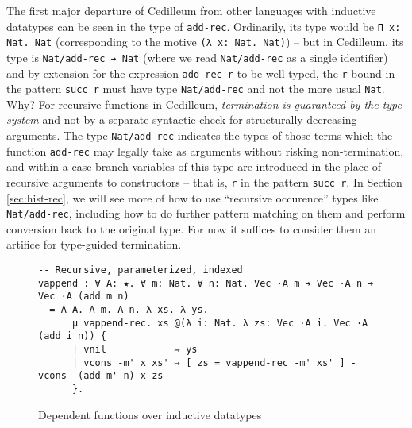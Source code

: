 \documentclass{article}
\newcommand{\vars}[1]{{\overline{#1}}}
\begin{document}
The first major departure of Cedilleum from other languages with inductive
datatypes can be seen in the type of \texttt{add-rec}. Ordinarily, its type
would be \verb;Π x: Nat. Nat; (corresponding to the motive
\verb;(λ x: Nat. Nat);) -- but in Cedilleum, its type is
\verb;Nat/add-rec ➔ Nat; (where we read \texttt{Nat/add-rec} as a single
identifier) and by extension for the expression \texttt{add-rec r} to be
well-typed, the \texttt{r} bound in the pattern \texttt{succ r} must have type
\texttt{Nat/add-rec} and not the more usual \texttt{Nat}. Why? For recursive
functions in Cedilleum, \textit{termination is guaranteed by the type system}
and not by a separate syntactic check for structurally-decreasing arguments. The
type \texttt{Nat/add-rec} indicates the types of those terms which the function
\texttt{add-rec} may legally take as arguments without risking non-termination,
and within a case branch variables of this type are introduced in the place of
recursive arguments to constructors -- that is, \texttt{r} in the
pattern \texttt{succ r}. In Section \ref{sec:hist-rec}, we will see more of how to use
``recursive occurence'' types like \texttt{Nat/add-rec}, including how to do
further pattern matching on them and perform conversion back to the original
type. For now it suffices to consider them an artifice for type-guided
termination.


\begin{figure}[h]
\begin{verbatim}
-- Recursive, parameterized, indexed
vappend : ∀ A: ★. ∀ m: Nat. ∀ n: Nat. Vec ·A m ➔ Vec ·A n ➔ Vec ·A (add m n)
  = Λ A. Λ m. Λ n. λ xs. λ ys.
      μ vappend-rec. xs @(λ i: Nat. λ zs: Vec ·A i. Vec ·A (add i n)) {
      | vnil            ↦ ys
      | vcons -m' x xs' ↦ [ zs = vappend-rec -m' xs' ] - vcons -(add m' n) x zs
      }.
\end{verbatim}
  \caption{Dependent functions over inductive datatypes}
  \label{fig:ex-data-dep}
\end{figure}
\end{document}
